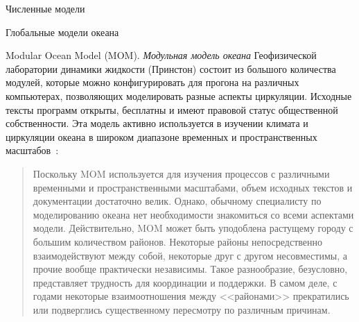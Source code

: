 \begin{chapter}{Численные модели}
\begin{section}{Глобальные модели океана}
\begin{paragraph}{Modular Ocean Model (MOM).}
%
\emph{Модульная модель океана} Геофизической лаборатории динамики жидкости (Принстон)
состоит из большого количества модулей, которые можно конфигурировать для
прогона на различных компьютерах, позволяющих моделировать разные аспекты 
циркуляции. Исходные тексты программ открыты, бесплатны и имеют правовой
статус общественной собственности. Эта модель активно используется в изучении 
климата и циркуляции океана в широком диапазоне временных и пространственных
масштабов~\cite{Pacanowski:1999}:
% 
\begin{quote}
Поскольку MOM используется для изучения процессов с различными временными 
и пространственными масштабами, объем исходных текстов и документации 
достаточно велик. Однако, обычному специалисту по моделированию океана
нет необходимости знакомиться со всеми аспектами модели. Действительно,
MOM может быть уподоблена растущему городу с большим количеством
районов. Некоторые районы непосредственно взаимодействуют между собой, 
некоторые друг с другом несовместимы, а прочие вообще практически независимы. 
Такое разнообразие, безусловно, представляет трудность для координации 
и поддержки. В самом деле, с годами некоторые взаимоотношения между 
<<районами>> прекратились или подверглись существенному пересмотру 
по различным причинам.
%
\end{quote}


\end{paragraph}
\end{section}
\end{chapter}
